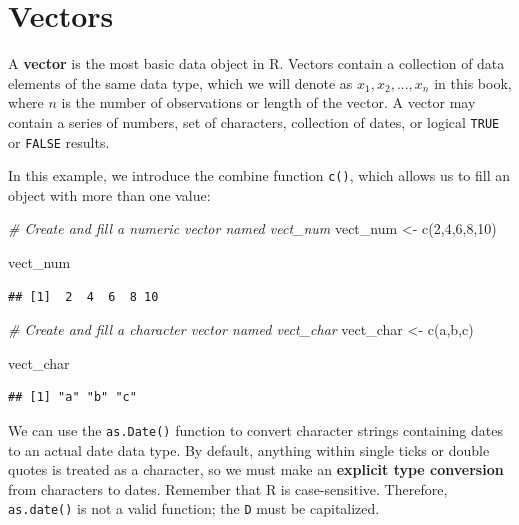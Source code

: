 \documentclass[
]{book}
\newenvironment{Shaded}{\begin{snugshade}}{\end{snugshade}}
\newcommand{\CommentTok}[1]{\textcolor[rgb]{0.56,0.35,0.01}{\textit{#1}}}
\newcommand{\DecValTok}[1]{\textcolor[rgb]{0.00,0.00,0.81}{#1}}
\newcommand{\FunctionTok}[1]{\textcolor[rgb]{0.00,0.00,0.00}{#1}}
\newcommand{\NormalTok}[1]{#1}
\newcommand{\OtherTok}[1]{\textcolor[rgb]{0.56,0.35,0.01}{#1}}
\newcommand{\StringTok}[1]{\textcolor[rgb]{0.31,0.60,0.02}{#1}}
\begin{document}
\hypertarget{vectors}{%
\section{Vectors}\label{vectors}}

A \textbf{vector} is the most basic data object in R. Vectors contain a collection of data elements of the same data type, which we will denote as \(x_1, x_2, ..., x_n\) in this book, where \(n\) is the number of observations or length of the vector. A vector may contain a series of numbers, set of characters, collection of dates, or logical \texttt{TRUE} or \texttt{FALSE} results.

In this example, we introduce the combine function \texttt{c()}, which allows us to fill an object with more than one value:

\begin{Shaded}
\begin{Highlighting}[]
\CommentTok{\# Create and fill a numeric vector named vect\_num}
\NormalTok{vect\_num }\OtherTok{\textless{}{-}} \FunctionTok{c}\NormalTok{(}\DecValTok{2}\NormalTok{,}\DecValTok{4}\NormalTok{,}\DecValTok{6}\NormalTok{,}\DecValTok{8}\NormalTok{,}\DecValTok{10}\NormalTok{)}

\NormalTok{vect\_num}
\end{Highlighting}
\end{Shaded}

\begin{verbatim}
## [1]  2  4  6  8 10
\end{verbatim}

\begin{Shaded}
\begin{Highlighting}[]
\CommentTok{\# Create and fill a character vector named vect\_char}
\NormalTok{vect\_char }\OtherTok{\textless{}{-}} \FunctionTok{c}\NormalTok{(}\StringTok{\textquotesingle{}a\textquotesingle{}}\NormalTok{,}\StringTok{\textquotesingle{}b\textquotesingle{}}\NormalTok{,}\StringTok{\textquotesingle{}c\textquotesingle{}}\NormalTok{)}

\NormalTok{vect\_char}
\end{Highlighting}
\end{Shaded}

\begin{verbatim}
## [1] "a" "b" "c"
\end{verbatim}

We can use the \texttt{as.Date()} function to convert character strings containing dates to an actual date data type. By default, anything within single ticks or double quotes is treated as a character, so we must make an \textbf{explicit type conversion} from characters to dates. Remember that R is case-sensitive. Therefore, \texttt{as.date()} is not a valid function; the \texttt{D} must be capitalized.
\end{document}
